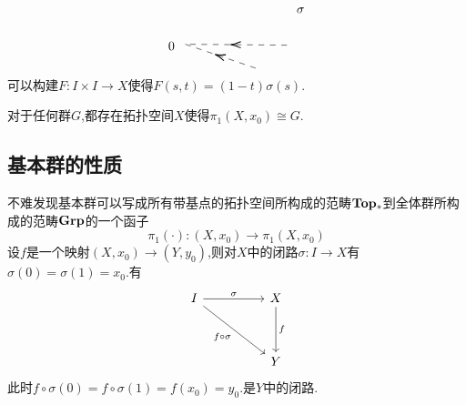 \documentclass{article}
\begin{document}
\begin{example}
\[\begin{tikzpicture}[x=0.75pt,y=0.75pt,yscale=-1,xscale=1]
    \draw  [dash pattern={on 4.5pt off 4.5pt}]  (240.11,106.98) -- (133.11,105.98) ;
    \draw [shift={(180.61,106.42)}, rotate = 0.54] [color={rgb, 255:red, 0; green, 0; blue, 0 }  ][line width=0.75]    (10.93,-3.29) .. controls (6.95,-1.4) and (3.31,-0.3) .. (0,0) .. controls (3.31,0.3) and (6.95,1.4) .. (10.93,3.29)   ;
    \draw  [dash pattern={on 4.5pt off 4.5pt}]  (207.11,130.98) -- (133.11,105.98) ;
    \draw [shift={(164.43,116.56)}, rotate = 18.67] [color={rgb, 255:red, 0; green, 0; blue, 0 }  ][line width=0.75]    (10.93,-3.29) .. controls (6.95,-1.4) and (3.31,-0.3) .. (0,0) .. controls (3.31,0.3) and (6.95,1.4) .. (10.93,3.29)   ;
    
    \draw (249,66.4) node [anchor=north west][inner sep=0.75pt]    {$\sigma $};
    \draw (114,102.4) node [anchor=north west][inner sep=0.75pt]    {$0$};
    \end{tikzpicture}\]
    可以构建$F : I \times I \to X$使得$F(s,t) = (1-t)\sigma(s)$.
\end{example}
\begin{theorem}
    对于任何群$G$,都存在拓扑空间$X$使得$\pi_1(X,x_0) \cong G$.
\end{theorem}

\subsection{基本群的性质}
不难发现基本群可以写成所有带基点的拓扑空间所构成的范畴$\bold{Top_*}$到全体群所构成的范畴$\bold{Grp}$的一个函子
$$
\pi_1(\cdot) : (X,x_0) \to \pi_1(X,x_0)
$$
设$f$是一个映射$(X,x_0) \to (Y,y_0)$,则对$X$中的闭路$\sigma : I \to X$有$\sigma(0) = \sigma(1) = x_0$.有
\[\begin{tikzcd}
	I && X \\
	\\
	&& Y
	\arrow["\sigma", from=1-1, to=1-3]
	\arrow["f", from=1-3, to=3-3]
	\arrow["{f \circ \sigma}"', from=1-1, to=3-3]
\end{tikzcd}\]
此时$f\circ \sigma(0) = f\circ \sigma (1) = f(x_0) = y_0$.是$Y$中的闭路.
\end{document}
